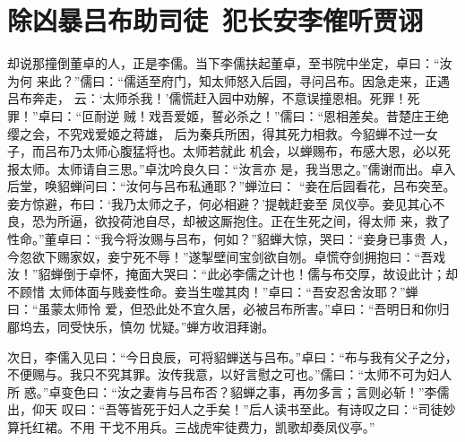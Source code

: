 \chapter{除凶暴吕布助司徒~犯长安李傕听贾诩}

却说那撞倒董卓的人，正是李儒。当下李儒扶起董卓，至书院中坐定，卓曰：“汝为何
来此？”儒曰：“儒适至府门，知太师怒入后园，寻问吕布。因急走来，正遇吕布奔走，
云：‘太师杀我！’儒慌赶入园中劝解，不意误撞恩相。死罪！死罪！”卓曰：“叵耐逆
贼！戏吾爱姬，誓必杀之！”儒曰：“恩相差矣。昔楚庄王绝缨之会，不究戏爱姬之蒋雄，
后为秦兵所困，得其死力相救。今貂蝉不过一女子，而吕布乃太师心腹猛将也。太师若就此
机会，以蝉赐布，布感大恩，必以死报太师。太师请自三思。”卓沈吟良久曰：“汝言亦
是，我当思之。”儒谢而出。卓入后堂，唤貂蝉问曰：“汝何与吕布私通耶？”蝉泣曰：
“妾在后园看花，吕布突至。妾方惊避，布曰：‘我乃太师之子，何必相避？’提戟赶妾至
凤仪亭。妾见其心不良，恐为所逼，欲投荷池自尽，却被这厮抱住。正在生死之间，得太师
来，救了性命。”董卓曰：“我今将汝赐与吕布，何如？”貂蝉大惊，哭曰：“妾身已事贵
人，今忽欲下赐家奴，妾宁死不辱！”遂掣壁间宝剑欲自刎。卓慌夺剑拥抱曰：“吾戏
汝！”貂蝉倒于卓怀，掩面大哭曰：“此必李儒之计也！儒与布交厚，故设此计；却不顾惜
太师体面与贱妾性命。妾当生噬其肉！”卓曰：“吾安忍舍汝耶？”蝉曰：“虽蒙太师怜
爱，但恐此处不宜久居，必被吕布所害。”卓曰：“吾明日和你归郿坞去，同受快乐，慎勿
忧疑。”蝉方收泪拜谢。

次日，李儒入见曰：“今日良辰，可将貂蝉送与吕布。”卓曰：“布与我有父子之分，
不便赐与。我只不究其罪。汝传我意，以好言慰之可也。”儒曰：“太师不可为妇人所
惑。”卓变色曰：“汝之妻肯与吕布否？貂蝉之事，再勿多言；言则必斩！”李儒出，仰天
叹曰：“吾等皆死于妇人之手矣！”后人读书至此。有诗叹之曰：“司徒妙算托红裙。不用
干戈不用兵。三战虎牢徒费力，凯歌却奏凤仪亭。”

